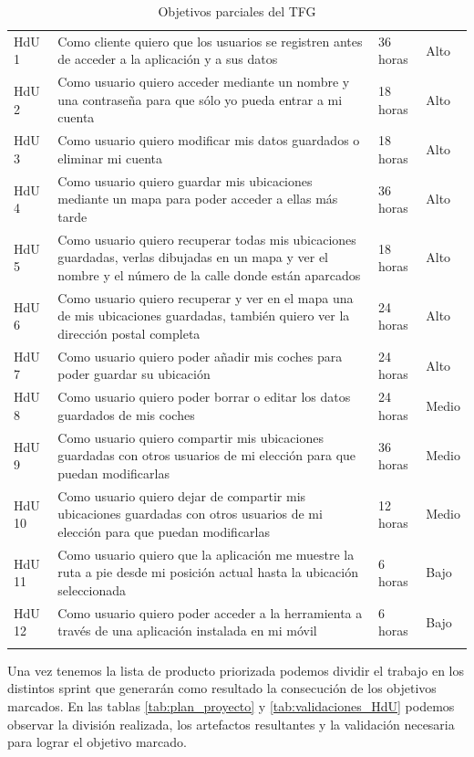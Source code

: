 \begin{longtable}{p{2cm} p{6cm} p{4cm} p{3cm}}
		\rowcolor{gray!25}
		HdU 1	&	Como cliente quiero que los usuarios se registren antes de acceder a la aplicación y a sus datos	
				&	36 horas		&	Alto	\\
		HdU 2	&	Como usuario quiero acceder mediante un nombre y una contraseña para que sólo yo pueda entrar a mi cuenta							&	18 horas	&	Alto	\\
		\rowcolor{gray!25}
		HdU 3	&	Como usuario quiero modificar mis datos guardados	o eliminar mi cuenta												
				&	18 horas	&	Alto	\\ 
		HdU 4	& 	Como usuario quiero guardar mis ubicaciones mediante un mapa para poder acceder a ellas más tarde	
				&	36 horas	&	Alto	\\
		\rowcolor{gray!25}
		HdU 5	&	Como usuario quiero recuperar todas mis ubicaciones guardadas, verlas dibujadas en un mapa y ver el nombre y el número de la calle donde están aparcados
				&	18 horas	&	Alto	\\
		HdU 6	&	Como usuario quiero recuperar y ver en el mapa una de mis ubicaciones guardadas, también quiero ver la dirección postal completa
				&	24 horas	&	Alto	\\
		\rowcolor{gray!25}
		HdU 7	&	Como usuario quiero poder añadir mis coches para poder guardar su ubicación															&	24 horas	&	Alto	\\
		HdU 8	&	Como usuario quiero poder borrar o editar los datos guardados de mis coches
				&	24 horas	&	Medio	\\	
		\rowcolor{gray!25}
		HdU 9	&	Como usuario quiero compartir mis ubicaciones guardadas con otros usuarios de mi elección para que puedan modificarlas			
				&	36 horas&	Medio	\\
		HdU 10	&	Como usuario quiero dejar de compartir mis ubicaciones guardadas con otros usuarios de mi elección para que puedan modificarlas			
				&	12 horas&	Medio	\\
		\rowcolor{gray!25}
		HdU 11	&	Como usuario quiero que la aplicación me muestre la ruta a pie desde mi posición actual hasta la ubicación seleccionada
				&	6 horas	&	Bajo	\\
		HdU 12	&	Como usuario quiero poder acceder a la herramienta a través de una aplicación instalada en mi móvil
				&	6 horas	&	Bajo	\\
	    \hline
	  \caption{Objetivos parciales del \ac{TFG}}
	  \label{tab:historia_usuario}
	\end{longtable}

Una vez tenemos la lista de producto priorizada podemos dividir el trabajo en los distintos sprint que generarán como resultado la consecución de los objetivos marcados. En las tablas \ref{tab:plan_proyecto} y \ref{tab:validaciones_HdU} podemos observar la división realizada, los artefactos resultantes y la validación necesaria para lograr el objetivo marcado.

